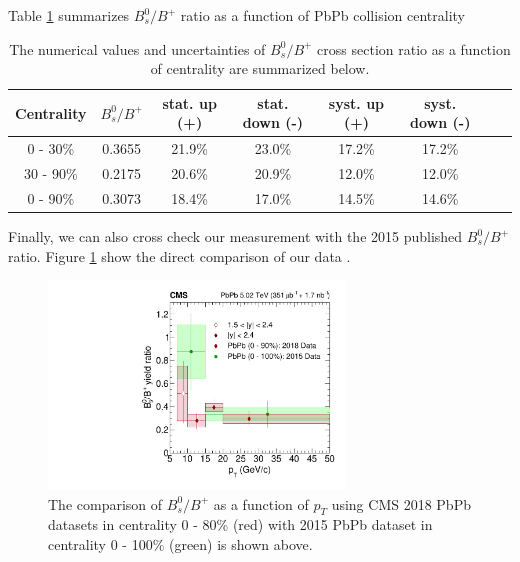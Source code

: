 Table \ref{BsBPPtCMS} summarizes $B^0_s/B^+$ ratio as a function of PbPb collision centrality


\begin{table}[h]
\begin{center}
\caption{The numerical values and uncertainties of $B^0_s/B^+$ cross section ratio as a function of centrality are summarized below.}
\vspace{1em}
\label{BsBPPtCMS}
  \begin{tabular}{| c | c |c | c| c| c| c| c|}
    \hline
Centrality & $B^0_s/B^+$ & stat. up (+) & stat. down (-)  & syst. up (+) & syst. down (-)  \\
    \hline
    \hline
    0 - 30\%  & 0.3655  & 21.9\%  & 23.0\% &  17.2\% & 17.2\% \\
    30 - 90\%  &  0.2175 & 20.6\% & 20.9\% &  12.0\%  & 12.0\%   \\
      0 - 90\%  & 0.3073   & 18.4\%  & 17.0\% &  14.5\% & 14.6\% \\
    \hline
    \hline
\end{tabular}
\end{center}
\end{table}


Finally, we can also cross check our measurement with the 2015 published $B^0_s/B^+$ ratio. Figure \ref{2018Comp2015} show the direct comparison of our data .

\begin{figure}[hbtp]
\begin{center}
\includegraphics[width=0.70\textwidth]{Figures/Chapter5/2018Comp2015.pdf}
\caption{The comparison of $B^0_s/B^+$ as a function of $p_T$ using CMS 2018 PbPb datasets in centrality 0 - 80\% (red) with 2015 PbPb dataset in centrality 0 - 100\% (green) is shown above.}
\label{2018Comp2015}
\end{center}
\end{figure}

